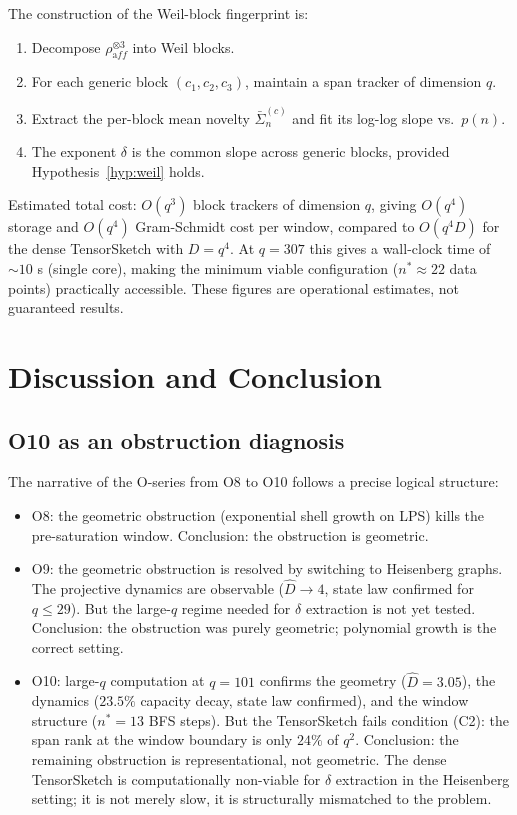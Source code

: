 \documentclass[11pt,a4paper]{article}
\newcommand{\Dhat}{\hat{D}}
\begin{document}
    The construction of the Weil-block fingerprint is:
    \begin{enumerate}
      \item Decompose $\rho_{\mathrm aff}^{\otimes 3}$ into Weil blocks.
      \item For each generic block $(c_1, c_2, c_3)$, maintain a span
      tracker of dimension $q$.
      \item Extract the per-block mean novelty $\bar\Sigma_n^{(c)}$
      and fit its log-log slope vs.\ $p(n)$.
      \item The exponent $\delta$ is the common slope across generic blocks,
      provided Hypothesis~\ref{hyp:weil} holds.
    \end{enumerate}
    Estimated total cost: $O(q^3)$ block trackers of dimension $q$,
    giving $O(q^4)$ storage and $O(q^4)$ Gram-Schmidt cost per window,
    compared to $O(q^4 D)$ for the dense TensorSketch with $D = q^4$.
    At $q = 307$ this gives a wall-clock time of $\sim 10$ s (single core),
    making the minimum viable configuration ($n^* \approx 22$ data points)
    practically accessible.
    These figures are operational estimates, not guaranteed results.

  \section{Discussion and Conclusion}

  \subsection{O10 as an obstruction diagnosis}

    The narrative of the O-series from O8 to O10 follows a precise logical
    structure:
    \begin{itemize}
      \item O8: the geometric obstruction (exponential shell growth on LPS)
      kills the pre-saturation window.
      Conclusion: the obstruction is geometric.
      \item O9: the geometric obstruction is resolved by switching to Heisenberg
      graphs.
      The projective dynamics are observable ($\Dhat \to 4$, state law confirmed
      for $q \leq 29$).
      But the large-$q$ regime needed for $\delta$ extraction is not yet tested.
      Conclusion: the obstruction was purely geometric; polynomial growth is
      the correct setting.
      \item O10: large-$q$ computation at $q = 101$ confirms the geometry
      ($\Dhat = 3.05$), the dynamics ($23.5\%$ capacity decay, state law
      confirmed), and the window structure ($n^* = 13$ BFS steps).
      But the TensorSketch fails condition (C2): the span rank at the window
      boundary is only $24\%$ of $q^2$.
      Conclusion: the remaining obstruction is representational, not geometric.
      The dense TensorSketch is computationally non-viable for $\delta$ extraction
      in the Heisenberg setting; it is not merely slow, it is
      structurally mismatched to the problem.
    \end{itemize}
\end{document}
